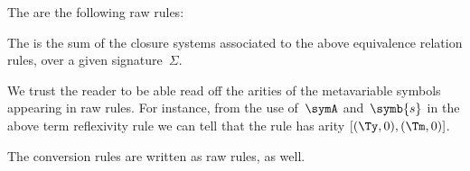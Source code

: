 \begin{definition}
  \label{def:equivalence-relation-rule}%
  The  are the following raw rules:
%
The  is the sum of the closure systems associated to the above equivalence relation rules, over a given signature~$\Sigma$.
\end{definition}

We trust the reader to be able read off the arities of the metavariable symbols appearing in raw rules.
%
For instance, from the use of~$\symA$ and~$\symb{s}$ in the above term reflexivity rule
we can tell that the rule has arity $[(\Ty,0),(\Tm,0)]$.

The conversion rules are written as raw rules, as well.

